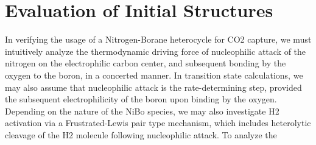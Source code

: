 \documentclass[12pt]{article}
\begin{document}
\section{Evaluation of Initial Structures} 

In verifying the usage of a Nitrogen-Borane heterocycle for CO2 capture, we must intuitively analyze the thermodynamic driving force of nucleophilic attack of the nitrogen on the electrophilic carbon center, and subsequent bonding by the oxygen to the boron, in a concerted manner. In transition state calculations, we may also assume that nucleophilic attack is the rate-determining step, provided the subsequent electrophilicity of the boron upon binding by the oxygen. Depending on the nature of the NiBo species, we may also investigate H2 activation via a Frustrated-Lewis pair type mechanism, which includes heterolytic cleavage of the H2 molecule following nucleophilic attack. To analyze the
\end{document}
